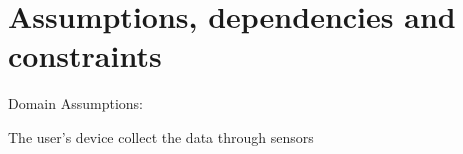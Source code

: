 \section{Assumptions, dependencies and constraints}
Domain Assumptions:
\begin{enumerate}[label={[}D.\arabic*{]}]

\item \label{d:1}
The user's device collect the data through sensors

\end{enumerate}



